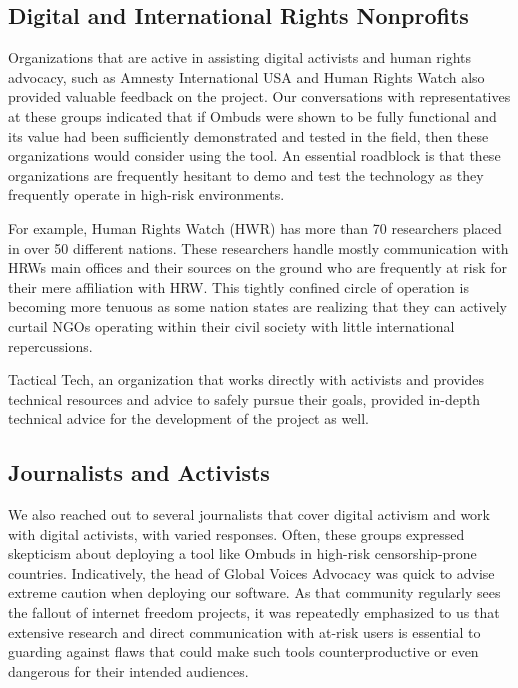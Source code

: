 \documentclass[a4paper]{article}
\begin{document}
\subsection{Digital and International Rights Nonprofits}
Organizations that are active in assisting digital activists and human rights advocacy, such as Amnesty International USA and Human Rights Watch also provided valuable feedback on the project. Our conversations with representatives at these groups indicated that if Ombuds were shown to be fully functional and its value had been sufficiently demonstrated and tested in the field, then these organizations would consider using the tool. An essential roadblock is that these organizations are frequently hesitant to demo and test the technology as they frequently operate in high-risk environments.\par

For example, Human Rights Watch (HWR) has more than 70 researchers placed in over 50 different nations. These researchers handle mostly communication with HRWs main offices and their sources on the ground who are frequently at risk for their mere affiliation with HRW. This tightly confined circle of operation is becoming more tenuous as some nation states are realizing that they can actively curtail NGOs operating within their civil society with little international repercussions.\par

Tactical Tech, an organization that works directly with activists and provides technical resources and advice to safely pursue their goals, provided in-depth technical advice for the development of the project as well.\par

\subsection{Journalists and Activists}
We also reached out to several journalists that cover digital activism and work with digital activists, with varied responses. Often, these groups expressed skepticism about deploying a tool like Ombuds in high-risk censorship-prone countries. Indicatively, the head of Global Voices Advocacy was quick to advise extreme caution when deploying our software. As that community regularly sees the fallout of internet freedom projects, it was repeatedly emphasized to us that extensive research and direct communication with at-risk users is essential to guarding against flaws that could make such tools counterproductive or even dangerous for their intended audiences. \par
\end{document}
